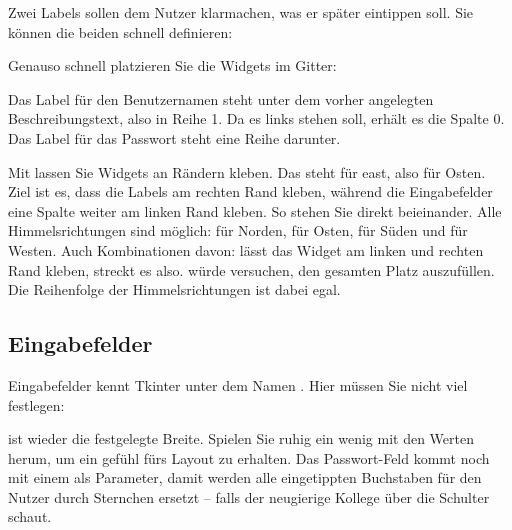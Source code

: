 Zwei Labels sollen dem Nutzer klarmachen, was er später eintippen soll. Sie können die beiden schnell definieren:

\medskip



\medskip

Genauso schnell platzieren Sie die Widgets im Gitter:

\medskip



\medskip

Das Label für den Benutzernamen steht unter dem vorher angelegten Beschreibungstext, also in Reihe 1. Da es links stehen soll, erhält es die Spalte 0. Das Label für das Passwort steht eine Reihe darunter.

Mit  lassen Sie Widgets an Rändern kleben. Das  steht für east, also für Osten. Ziel ist es, dass die Labels am rechten Rand kleben, während die Eingabefelder eine Spalte weiter am linken Rand kleben. So stehen Sie direkt beieinander. Alle Himmelsrichtungen sind möglich:  für Norden,  für Osten,  für Süden und  für Westen. Auch Kombinationen davon:  lässt das Widget am linken und rechten Rand kleben, streckt es also.  würde versuchen, den gesamten Platz auszufüllen. Die Reihenfolge der Himmelsrichtungen ist dabei egal.

\subsection{Eingabefelder}

Eingabefelder kennt Tkinter unter dem Namen . Hier müssen Sie nicht viel festlegen:

\medskip



\medskip

 ist wieder die festgelegte Breite. Spielen Sie ruhig ein wenig mit den Werten herum, um ein gefühl fürs Layout zu erhalten. Das Passwort-Feld kommt noch mit einem  als Parameter, damit werden alle eingetippten Buchstaben für den Nutzer durch Sternchen ersetzt -- falls der neugierige Kollege über die Schulter schaut.

